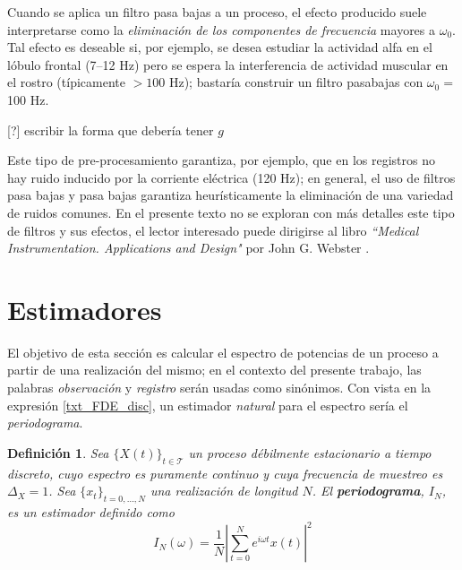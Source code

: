 \documentclass[12pt,letterpaper,draft]{book}
\newtheorem{definicion}{Definición}[chapter]
\newcommand{\abso}[1]{\left| #1 \right|}
\newcommand{\xt}{$\{X(t)\}_{t\in \mathcal{T}}$ }
\newcommand{\xtd}{$\{x_t\}_{t=0,\dots,N}$ }
\newcommand{\hz}{\si{\hertz}\xspace}
\begin{document}
Cuando se aplica un filtro pasa bajas a un proceso, el efecto producido suele interpretarse como la \textit{eliminación de los componentes de frecuencia} mayores a $\omega_0$. 
%
Tal efecto es deseable si, por ejemplo, se desea estudiar la actividad alfa en el lóbulo frontal (7--12 \hz) pero se espera la interferencia de actividad muscular en el rostro (típicamente $>100$ \hz); bastaría construir un filtro pasabajas con $\omega_0 = $ 100 \hz.

[?] escribir la forma que debería tener $g$

Este tipo de pre-procesamiento garantiza, por ejemplo, que en los registros no hay ruido inducido por la corriente eléctrica (120 \hz); en general, el uso de filtros pasa bajas y pasa bajas garantiza heurísticamente la eliminación de una variedad de ruidos comunes.
%
En el presente texto no se exploran con más detalles este tipo de filtros y sus efectos, el lector interesado puede dirigirse al libro \textit{``Medical {I}nstrumentation. {A}pplications and {D}esign"} por John G. Webster \cite{Webster}.


\section{Estimadores}
\label{sec:estimadores}

El objetivo de esta sección es calcular el espectro de potencias de un proceso a partir de una realización del mismo; en el contexto del presente trabajo, las palabras \textit{observación} y \textit{registro} serán usadas como sinónimos.
%
Con vista en la expresión \ref{txt_FDE_disc}, un estimador \textit{natural} para el espectro sería el \textit{periodograma}.

\begin{definicion}
Sea \xt un proceso débilmente estacionario a tiempo discreto, cuyo espectro es puramente continuo y cuya frecuencia de muestreo es $\Delta_X=1$. Sea \xtd una realización de longitud $N$. 
%
El \textbf{periodograma}, $I_N$, es un estimador 
definido como
\begin{equation}
I_N(\omega) = \frac{1}{N} \abso{\sum_{t = 0}^{N} e^{i \omega t} x(t)}^{2}
\end{equation}
\label{txt_periodograma}
\end{definicion}
\end{document}
